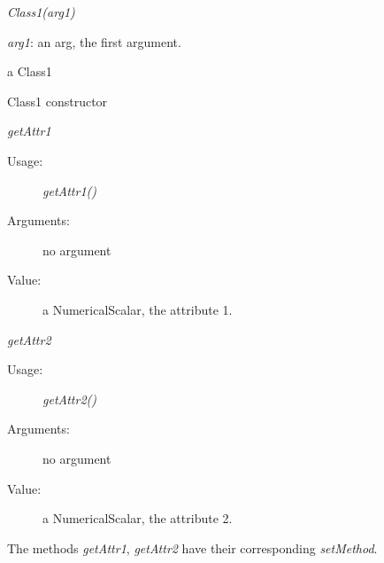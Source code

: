 \begin{description}

\item[Usage:] \rule{0pt}{1em}
  \begin{description}
  \item \textit{Class1(arg1)}
  \end{description}

\item[Arguments:]  \rule{0pt}{1em}
  \begin{description}
  \item \textit{arg1}: an arg, the first argument.
  \end{description}

\item[Value:] a Class1

\item[Details:]  \rule{0pt}{1em}
  \begin{description}
  \item Class1 constructor
  \end{description}

\item \textit{getAttr1}
    \begin{description}
    \item[Usage:] \textit{getAttr1()}
    \item[Arguments:] no argument
    \item[Value:] a NumericalScalar, the attribute 1.
    \end{description}
    \bigskip
    
\item \textit{getAttr2}
    \begin{description}
    \item[Usage:] \textit{getAttr2()}
    \item[Arguments:] no argument
    \item[Value:] a NumericalScalar, the attribute 2.
    \end{description}
    \bigskip
The methods \textit{getAttr1}, \textit{getAttr2} have their corresponding \textit{setMethod}.

\item[Links] \rule{0pt}{1em}
\end{description}

